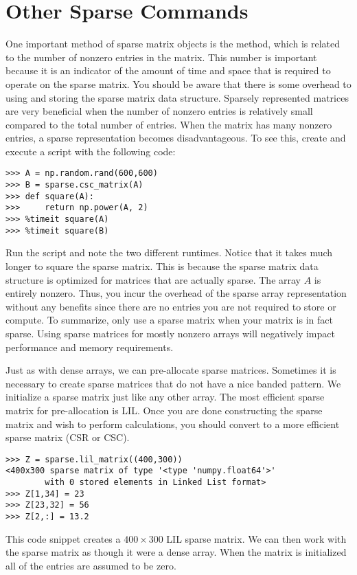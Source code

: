 \section*{Other Sparse Commands}
One important method of sparse matrix objects is the  method,
which is related to the number of nonzero entries in the matrix.
This number is important because it is an indicator of the amount of time and space
that is required to operate on the sparse matrix.
You should be aware that there is some overhead to using and storing the sparse matrix data structure.
Sparsely represented matrices are very beneficial when the number of
nonzero entries is relatively small compared to the total number of entries.
When the matrix has many nonzero entries, a sparse representation becomes disadvantageous.
To see this, create and execute a script with the following code:
\begin{lstlisting}
>>> A = np.random.rand(600,600)
>>> B = sparse.csc_matrix(A)
>>> def square(A):
>>>     return np.power(A, 2)
>>> %timeit square(A)
>>> %timeit square(B)
\end{lstlisting}
Run the script and note the two different runtimes.
Notice that it takes much longer to square the sparse matrix.
This is because the sparse matrix data structure is optimized for matrices that are actually sparse.
The array $A$ is entirely nonzero.
Thus, you incur the overhead of the sparse array representation without any
benefits since there are no entries you are not required to store or compute.
To summarize, only use a sparse matrix when your matrix is in fact sparse.
Using sparse matrices for mostly nonzero arrays will negatively impact performance and memory requirements.

Just as with dense arrays, we can pre-allocate sparse matrices.
Sometimes it is necessary to create sparse matrices that do not have a nice banded pattern.
We initialize a sparse matrix just like any other array.
The most efficient sparse matrix for pre-allocation is LIL.
Once you are done constructing the sparse matrix and wish to perform calculations,
you should convert to a more efficient sparse matrix (CSR or CSC).
\begin{lstlisting}
>>> Z = sparse.lil_matrix((400,300))
<400x300 sparse matrix of type '<type 'numpy.float64'>'
        with 0 stored elements in Linked List format>
>>> Z[1,34] = 23
>>> Z[23,32] = 56
>>> Z[2,:] = 13.2
\end{lstlisting}
This code snippet creates a $400 \times 300$ LIL sparse matrix.
We can then work with the sparse matrix as though it were a dense array.
When the matrix is initialized all of the entries are assumed to be zero. 